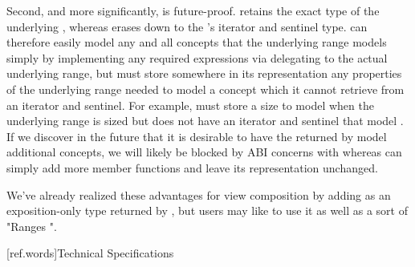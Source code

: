 Second, and more significantly,  is future-proof.
 retains the exact type of the underlying
, whereas  erases down to the
's iterator and sentinel type. 
can therefore easily model any and all concepts that the underlying range models
simply by implementing any required expressions via delegating to the actual
underlying range, but  must store somewhere in its
representation any properties of the underlying range needed to model a
concept which it cannot retrieve from an iterator and sentinel. For example,
 must store a size to model  when the
underlying range is sized but does not have an iterator and sentinel that model
. If we discover in the future that it is desirable
to have the  returned by  model
additional concepts, we will likely be blocked by ABI concerns with
 whereas  can simply add more member
functions and leave its representation unchanged.

We've already realized these advantages for view composition by adding
 as an exposition-only  type returned
by , but users may like to use it as well as a sort of "Ranges
".

[ref.words]{Technical Specifications}

